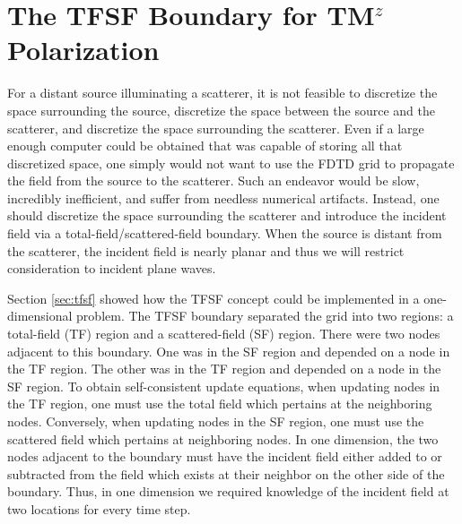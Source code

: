 \section{The TFSF Boundary for TM$^z$ Polarization}

For a distant source illuminating a scatterer, it is not feasible to
discretize the space surrounding the source, discretize the space
between the source and the scatterer, and discretize the space
surrounding the scatterer.  Even if a large enough computer could be
obtained that was capable of storing all that discretized space, one
simply would not want to use the FDTD grid to propagate the field from
the source to the scatterer.  Such an endeavor would be slow,
incredibly inefficient, and suffer from needless numerical artifacts.
Instead, one should discretize the space surrounding the scatterer and
introduce the incident field via a total-field/scattered-field
boundary.  When the source is distant from the scatterer, the incident
field is nearly planar and thus we will restrict consideration to
incident plane waves.

Section \ref{sec:tfsf} showed how the TFSF concept could be
implemented in a one-dimensional problem.  The TFSF boundary separated
the grid into two regions: a total-field (TF) region and a
scattered-field (SF) region.  There were two nodes adjacent to this
boundary.  One was in the SF region and depended on a node in the TF
region.  The other was in the TF region and depended on a node in the
SF region.  To obtain self-consistent update equations, when updating
nodes in the TF region, one must use the total field which pertains at
the neighboring nodes.  Conversely, when updating nodes in the SF
region, one must use the scattered field which pertains at neighboring
nodes.  In one dimension, the two nodes adjacent to the boundary must
have the incident field either added to or subtracted from the field
which exists at their neighbor on the other side of the boundary.
Thus, in one dimension we required knowledge of the incident field at
two locations for every time step.

